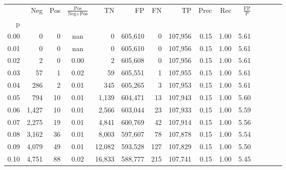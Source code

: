 \begin{tabular}{rrrcrrrrrrrrrrr}
\toprule
{} &     Neg &    Pos & $\frac{\text{Pos}}{\text{Neg}+\text{Pos}}$ &       TN &       FP &       FN &       TP &  Prec &   Rec & $\frac{\text{FP}}{\text{P}}$ \\
p    &         &        &                                            &          &          &          &          &       &       &                              \\
\midrule
0.00 &       0 &      0 &                                        nan &        0 &  605,610 &        0 &  107,956 &  0.15 &  1.00 &                         5.61 \\
0.01 &       0 &      0 &                                        nan &        0 &  605,610 &        0 &  107,956 &  0.15 &  1.00 &                         5.61 \\
0.02 &       2 &      0 &                                       0.00 &        2 &  605,608 &        0 &  107,956 &  0.15 &  1.00 &                         5.61 \\
0.03 &      57 &      1 &                                       0.02 &       59 &  605,551 &        1 &  107,955 &  0.15 &  1.00 &                         5.61 \\
0.04 &     286 &      2 &                                       0.01 &      345 &  605,265 &        3 &  107,953 &  0.15 &  1.00 &                         5.61 \\
0.05 &     794 &     10 &                                       0.01 &    1,139 &  604,471 &       13 &  107,943 &  0.15 &  1.00 &                         5.60 \\
0.06 &   1,427 &     10 &                                       0.01 &    2,566 &  603,044 &       23 &  107,933 &  0.15 &  1.00 &                         5.59 \\
0.07 &   2,275 &     19 &                                       0.01 &    4,841 &  600,769 &       42 &  107,914 &  0.15 &  1.00 &                         5.56 \\
0.08 &   3,162 &     36 &                                       0.01 &    8,003 &  597,607 &       78 &  107,878 &  0.15 &  1.00 &                         5.54 \\
0.09 &   4,079 &     49 &                                       0.01 &   12,082 &  593,528 &      127 &  107,829 &  0.15 &  1.00 &                         5.50 \\
0.10 &   4,751 &     88 &                                       0.02 &   16,833 &  588,777 &      215 &  107,741 &  0.15 &  1.00 &                         5.45 \\

\end{tabular}
